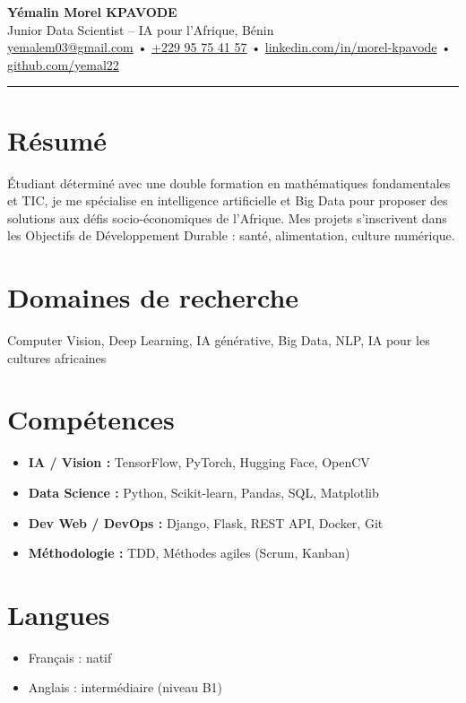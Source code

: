 \documentclass[a4paper,10pt]{article}
\begin{document}
\begin{center}
  {\Huge \textbf{Yémalin Morel KPAVODE}}\\
  \vspace{2pt}
  Junior Data Scientist – IA pour l’Afrique, Bénin\\
  \href{mailto:yemalem03@gmail.com}{yemalem03@gmail.com} • 
  \href{tel:+22995754157}{+229 95 75 41 57} • 
  \href{https://linkedin.com/in/morel-kpavode}{linkedin.com/in/morel-kpavode} • 
  \href{https://github.com/yemal22}{github.com/yemal22}
\end{center}

\vspace{0.5em}
\hrule
\vspace{1.2em}

\section*{Résumé}
\noindent
Étudiant déterminé avec une double formation en mathématiques fondamentales et TIC, je me spécialise en intelligence artificielle et Big Data pour proposer des solutions aux défis socio-économiques de l'Afrique. Mes projets s’inscrivent dans les Objectifs de Développement Durable : santé, alimentation, culture numérique.

\section*{Domaines de recherche}
Computer Vision, Deep Learning, IA générative, Big Data, NLP, IA pour les cultures africaines

\section*{Compétences}
\begin{itemize}
  \item \textbf{IA / Vision :} TensorFlow, PyTorch, Hugging Face, OpenCV
  \item \textbf{Data Science :} Python, Scikit-learn, Pandas, SQL, Matplotlib
  \item \textbf{Dev Web / DevOps :} Django, Flask, REST API, Docker, Git
  \item \textbf{Méthodologie :} TDD, Méthodes agiles (Scrum, Kanban)
\end{itemize}

\section*{Langues}
\begin{itemize}
  \item Français : natif
  \item Anglais : intermédiaire (niveau B1)
\end{itemize}
\end{document}
